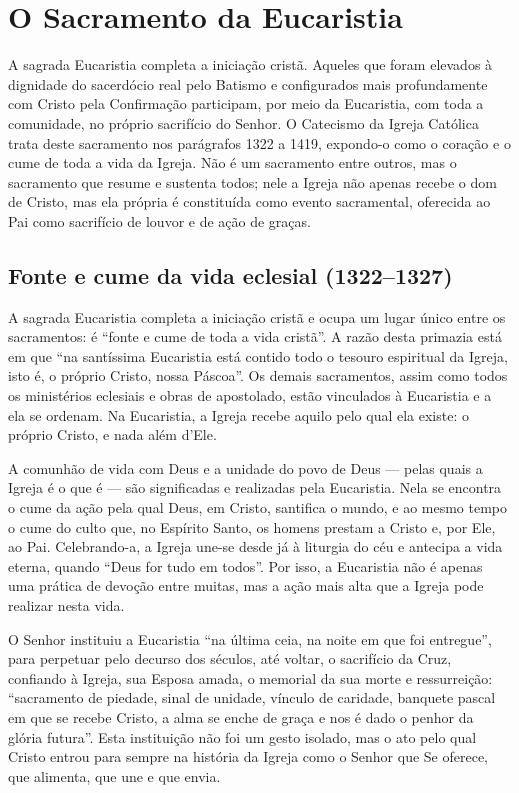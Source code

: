 \chapter{O Sacramento da Eucaristia}

A sagrada Eucaristia completa a iniciação cristã. Aqueles que foram elevados à dignidade do sacerdócio real pelo Batismo e configurados mais profundamente com Cristo pela Confirmação participam, por meio da Eucaristia, com toda a comunidade, no próprio sacrifício do Senhor. O Catecismo da Igreja Católica trata deste sacramento nos parágrafos 1322 a 1419, expondo-o como o coração e o cume de toda a vida da Igreja. Não é um sacramento entre outros, mas o sacramento que resume e sustenta todos; nele a Igreja não apenas recebe o dom de Cristo, mas ela própria é constituída como evento sacramental, oferecida ao Pai como sacrifício de louvor e de ação de graças.

\section{Fonte e cume da vida eclesial (1322--1327)}

A sagrada Eucaristia completa a iniciação cristã e ocupa um lugar único entre os sacramentos: é ``fonte e cume de toda a vida cristã''. A razão desta primazia está em que ``na santíssima Eucaristia está contido todo o tesouro espiritual da Igreja, isto é, o próprio Cristo, nossa Páscoa''. Os demais sacramentos, assim como todos os ministérios eclesiais e obras de apostolado, estão vinculados à Eucaristia e a ela se ordenam. Na Eucaristia, a Igreja recebe aquilo pelo qual ela existe: o próprio Cristo, e nada além d'Ele.

A comunhão de vida com Deus e a unidade do povo de Deus --- pelas quais a Igreja é o que é --- são significadas e realizadas pela Eucaristia. Nela se encontra o cume da ação pela qual Deus, em Cristo, santifica o mundo, e ao mesmo tempo o cume do culto que, no Espírito Santo, os homens prestam a Cristo e, por Ele, ao Pai. Celebrando-a, a Igreja une-se desde já à liturgia do céu e antecipa a vida eterna, quando ``Deus for tudo em todos''. Por isso, a Eucaristia não é apenas uma prática de devoção entre muitas, mas a ação mais alta que a Igreja pode realizar nesta vida.

O Senhor instituiu a Eucaristia ``na última ceia, na noite em que foi entregue'', para perpetuar pelo decurso dos séculos, até voltar, o sacrifício da Cruz, confiando à Igreja, sua Esposa amada, o memorial da sua morte e ressurreição: ``sacramento de piedade, sinal de unidade, vínculo de caridade, banquete pascal em que se recebe Cristo, a alma se enche de graça e nos é dado o penhor da glória futura''. Esta instituição não foi um gesto isolado, mas o ato pelo qual Cristo entrou para sempre na história da Igreja como o Senhor que Se oferece, que alimenta, que une e que envia.


